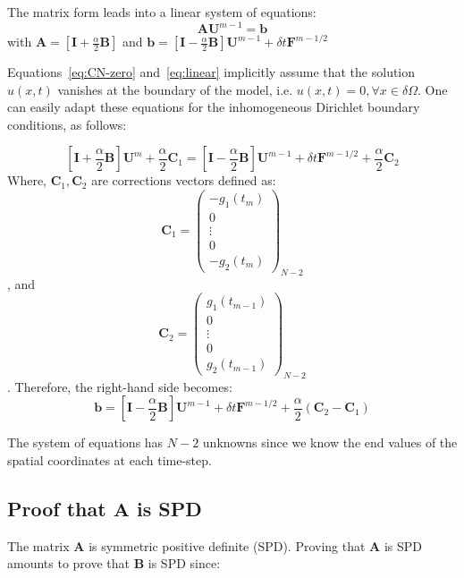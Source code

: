 \documentclass[10pt]{article}
\begin{document}
The matrix form leads into a linear system of equations:
\begin{equation}
\mathbf{A} \mathbf{U}^{m-1} = \mathbf{b}
\label{eq:linear}
\end{equation}
with $\mathbf{A} = \left[\mathbf{I} +\frac{\alpha}{2}\mathbf{B} \right]$ and 
$\mathbf{b} = \left[\mathbf{I} -\frac{\alpha}{2} \mathbf{B}\right]\mathbf{U}^{m-1}%
 +\delta t \mathbf{F}^{m-1/2}$

Equations~\ref{eq:CN-zero} and~\ref{eq:linear} implicitly assume that the solution $u(x,t)$
vanishes at the boundary of the model, i.e. $u(x,t)=0, \forall x \in \delta \Omega$. One can
easily adapt these equations for the inhomogeneous Dirichlet boundary conditions, as follows:



\[
\left[\mathbf{I} +\frac{\alpha}{2}\mathbf{B} \right] \mathbf{U}^m +\frac{\alpha}{2}\mathbf{C}_1= \left[\mathbf{I}%
 -\frac{\alpha}{2} \mathbf{B}\right]\mathbf{U}^{m-1} +\delta t \mathbf{F}^{m-1/2} +\frac{\alpha}{2}\mathbf{C}_2
\]
Where, $\mathbf{C}_1,\mathbf{C}_2$ are corrections vectors defined as:
\[
\mathbf{C}_1=
 \begin{pmatrix}
  -g_1(t_m) \\
  0         \\
  \vdots    \\
  0         \\
  -g_2(t_m)         
 \end{pmatrix}_{N-2}
\], and
\[
\mathbf{C}_2=
 \begin{pmatrix}
  g_1(t_{m-1}) \\
  0         \\
  \vdots    \\
  0         \\
  g_2(t_{m-1})         
 \end{pmatrix}_{N-2}
\]
. Therefore, the right-hand side becomes:
\begin{equation}
\mathbf{b} = \left[\mathbf{I} -\frac{\alpha}{2} \mathbf{B}\right]\mathbf{U}^{m-1}%
 +\delta t \mathbf{F}^{m-1/2} +\frac{\alpha}{2}\left(\mathbf{C}_2 -\mathbf{C}_1\right)
\label{eq:CN-dirichlet}
\end{equation} 

The system of equations has $N-2$ unknowns since we know the end values of the 
spatial coordinates at each time-step.


\subsection{Proof that $\mathbf{A}$ is SPD}
The matrix $\mathbf{A}$ is symmetric positive definite (SPD). Proving that $\mathbf{A}$ 
is SPD amounts to prove that $\mathbf{B}$ is SPD since:
\end{document}
